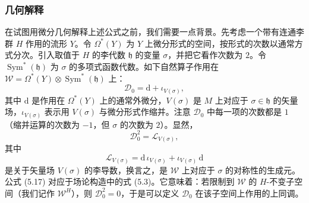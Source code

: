 \documentclass[11pt,a4paper,UTF8]{ctexart}
\theoremstyle{plain}
\theoremstyle{definition}
\begin{document}

\subsubsection{几何解释}

在试图用微分几何解释上述公式之前，我们需要一点背景。先考虑一个带有连通李群 $H$ 作用的流形 $Y$。令 $\Omega^*(Y)$ 为 $Y$ 上微分形式的空间，按形式的次数以通常方式分次。引入取值于 $H$ 的李代数 $\mathfrak h$ 的变量 $\sigma$，并把它看作次数为 $2$。令 $\operatorname{Sym}^*(\mathfrak h)$ 为 $\sigma$ 的多项式函数代数。如下自然算子作用在 $\mathcal W=\Omega^*(Y)\otimes\operatorname{Sym}^*(\mathfrak h)$ 上：
\begin{equation}
    \mathcal D_0=\mathrm d+\iota_{V(\sigma)},
    \tag{5.16}
\end{equation}
其中 $\mathrm d$ 是作用在 $\Omega^*(Y)$ 上的通常外微分，$V(\sigma)$ 是 $M$ 上对应于 $\sigma\in\mathfrak h$ 的矢量场，$\iota_{V(\sigma)}$ 表示用 $V(\sigma)$ 与微分形式作缩并。注意 $\mathcal D_0$ 中每一项的次数都是 $1$（缩并运算的次数为 $-1$，但 $\sigma$ 的次数为 $2$）。显然，
\begin{equation}
    \mathcal D_0^2=\mathcal L_{V(\sigma)},
    \tag{5.17}
\end{equation}
其中
\begin{equation}
    \mathcal L_{V(\sigma)}=\mathrm d\,\iota_{V(\sigma)}+\iota_{V(\sigma)}\,\mathrm d
    \tag{5.18}
\end{equation}
是关于矢量场 $V(\sigma)$ 的李导数，换言之，是 $\mathcal W$ 上对应于 $\sigma$ 的对称性的生成元。公式 (5.17) 对应于场论构造中的式 (5.3)。它意味着：若限制到 $\mathcal W$ 的 $H$-不变子空间（我们记作 $\mathcal W^H$），则 $\mathcal D_0^2=0$，于是可以定义 $\mathcal D_0$ 在该子空间上作用的上同调。

\end{document}
